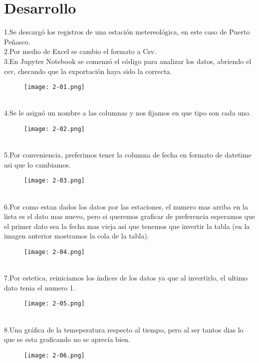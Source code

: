 \documentclass{article}
\begin{document}
\section{Desarrollo}
1.Se descargó los registros de una estación metereológica, en este caso de Puerto Peñasco.\\
2.Por medio de Excel se cambio el formato a Csv.\\
3.En Jupyter Notebook se comenzó el código para analizar los datos, abriendo el csv, checando que la exportación haya sido la correcta.\\
\begin{figure}[h]
  \texttt{[image: 2-01.png]}
\end{figure}
\\
4.Se le asignó un nombre a las columnas y nos fijamos en que tipo son cada uno.\\
\begin{figure}[h]
  \texttt{[image: 2-02.png]}
\end{figure}
\\
\clearpage
5.Por conveniencia, preferimos tener la columna de fecha en formato de datetime asi que lo cambiamos.\\
\begin{figure}[h]
  \texttt{[image: 2-03.png]}
\end{figure}
\\
6.Por como estan dados los datos por las estaciones, el numero mas arriba en la lista es el dato mas nuevo, pero si queremos graficar de preferencia esperamos que el primer dato sea la fecha mas vieja asi que tenemos que invertir la tabla (en la imagen anterior mostramos la cola de la tabla).\\
\begin{figure}[h]
  \texttt{[image: 2-04.png]}
\end{figure}
\\
7.Por estetica, reiniciamos los índices de los datos ya que al invertirlo, el ultimo dato tenia el numero 1.\\
\begin{figure}[h]
  \texttt{[image: 2-05.png]}
\end{figure}
\\
\clearpage
8.Una gráfica de la temeperatura respecto al tiempo, pero al ser tantos dias lo que se esta graficando no se aprecía bien.\\
\begin{figure}[h]
  \texttt{[image: 2-06.png]}
\end{figure}
\end{document}
